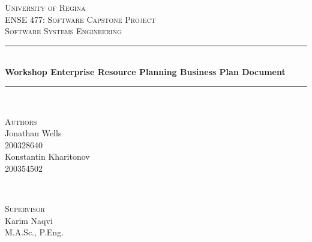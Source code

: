 \begin{titlepage} %
	\newcommand{\HRule}{\rule{\linewidth}{0.5mm}} %
	
	\center %
	
	
	\textsc{\Huge University of Regina}\\[1.5cm] %

	\textsc{\Large ENSE 477: Software Capstone Project}\\[0.5cm]
	
	\textsc{\Large Software Systems Engineering}\\[0.5cm] %
	
	
	
	
	
	\HRule\\[0.4cm]
	
	{\Huge\bfseries Workshop Enterprise Resource Planning Business Plan Document}\\[0.4cm] %
	
	\HRule\\[1.5cm]
	
	
	\begin{minipage}[t]{0.4\textwidth}
		\begin{flushleft}
			\large
			\textsc{Authors}\\
			Jonathan Wells\\
			\textsc{200328640}\\ %
			\large
			Konstantin Kharitonov\\
			\textsc{200354502} %
		\end{flushleft}
		
	\end{minipage}
	~
	\begin{minipage}[t]{0.4\textwidth}
		\begin{flushright}
			\large
			\textsc{Supervisor}\\ %
			Karim Naqvi\\
			M.A.Sc., P.Eng.\\
		\end{flushright}
	\end{minipage}
	

\end{titlepage}
